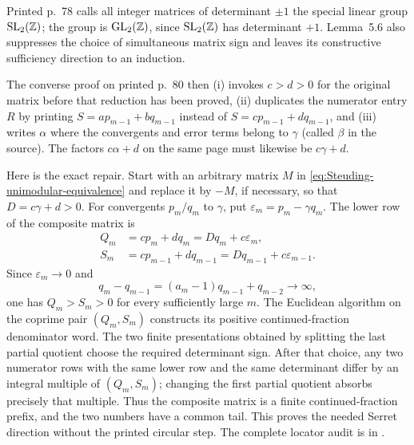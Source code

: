 \begin{sourceissue}
\label{sourceissue:Steuding-Serret-proof}
Printed p.~78 calls all integer matrices of determinant $\pm1$ the special
linear group $\mathrm{SL}_2(\mathbb{Z})$; the group is $\mathrm{GL}_2(\mathbb{Z})$, since
$\mathrm{SL}_2(\mathbb{Z})$ has determinant $+1$.  Lemma~5.6 also suppresses the
choice of simultaneous matrix sign and leaves its constructive sufficiency
direction to an induction.

The converse proof on printed p.~80 then (i) invokes $c>d>0$ for the original
matrix before that reduction has been proved, (ii) duplicates the numerator
entry $R$ by printing
$S=ap_{m-1}+bq_{m-1}$ instead of
$S=cp_{m-1}+dq_{m-1}$, and (iii) writes $\alpha$ where the convergents and
error terms belong to $\gamma$ (called $\beta$ in the source).  The factors
$c\alpha+d$ on the same page must likewise be $c\gamma+d$.

Here is the exact repair.  Start with an arbitrary matrix $M$ in
\eqref{eq:Steuding-unimodular-equivalence} and replace it by $-M$, if
necessary, so that $D=c\gamma+d>0$.  For convergents $p_m/q_m$ to $\gamma$,
put $\varepsilon_m=p_m-\gamma q_m$.  The lower row of the composite matrix
is
\begin{align*}
 Q_m&=cp_m+dq_m=Dq_m+c\varepsilon_m,\\
 S_m&=cp_{m-1}+dq_{m-1}=Dq_{m-1}+c\varepsilon_{m-1}.
\end{align*}
Since $\varepsilon_m\to0$ and
\[
 q_m-q_{m-1}=(a_m-1)q_{m-1}+q_{m-2}\longrightarrow\infty,
\]
one has $Q_m>S_m>0$ for every sufficiently large $m$.  The Euclidean
algorithm on the coprime pair $(Q_m,S_m)$ constructs its positive
continued-fraction denominator word.  The two finite presentations obtained
by splitting the last partial quotient choose the required determinant sign.
After that choice, any two numerator rows with the same lower row and the
same determinant differ by an integral multiple of $(Q_m,S_m)$; changing
the first partial quotient absorbs precisely that multiple.  Thus the
composite matrix is a finite continued-fraction prefix, and the two numbers
have a common tail.  This proves the needed Serret direction without the
printed circular step.  The complete locator audit is in
.
\end{sourceissue}

